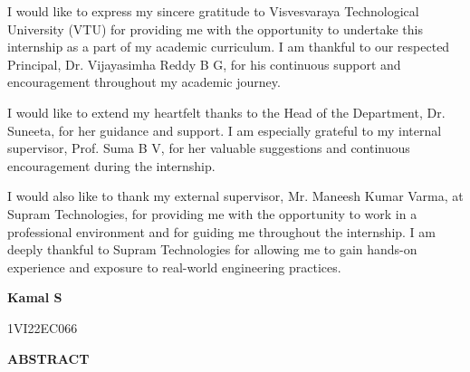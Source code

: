 \documentclass[12pt,a4paper]{report}
\begin{document}
\vspace{0.5cm}
\setlength{\parindent}{1.5em}
\begin{onehalfspacing}

I would like to express my sincere gratitude to Visvesvaraya Technological University (VTU) for providing me with the opportunity to undertake this internship as a part of my academic curriculum. I am thankful to our respected Principal, Dr. Vijayasimha Reddy B G, for his continuous support and encouragement throughout my academic journey.


I would like to extend my heartfelt thanks to the Head of the Department, Dr. Suneeta, for her guidance and support. I am especially grateful to my internal supervisor, Prof. Suma B V, for her valuable suggestions and continuous encouragement during the internship.


I would also like to thank my external supervisor, Mr. Maneesh Kumar Varma, at Supram Technologies, for providing me with the opportunity to work in a professional environment and for guiding me throughout the internship. I am deeply thankful to Supram Technologies for allowing me to gain hands-on experience and exposure to real-world engineering practices.

\end{onehalfspacing}

\vspace{1cm}
\begin{flushright}
\textbf{Kamal S}\par
1VI22EC066\par
\end{flushright}

\newpage
\begin{center}
{\Large \textbf{ABSTRACT}\par}
\end{center}

\vspace{0.5cm}
\setlength{\parindent}{1.5em}
\end{document}
